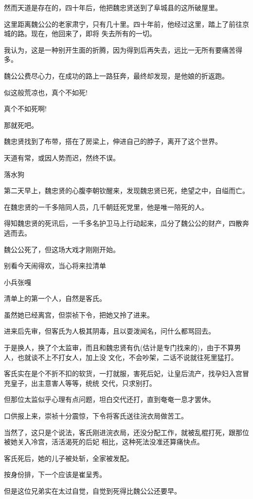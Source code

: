 \documentclass[11pt,a4paper,onecolumn]{article}
\begin{document}
然而天道是存在的，四十年后，他把魏忠贤送到了阜城县的这所破屋里。

这里距离魏公公的老家肃宁，只有几十里。四十年前，他经过这里，踏上了前往京城的路。现在，他回来了，即将
失去所有的一切。

我认为，这是一种别开生面的折腾，因为得到后再失去，远比一无所有要痛苦得多。

魏公公费尽心力，在成功的路上一路狂奔，最终却发现，是他娘的折返跑。

似这般荒凉也，真个不如死!

真个不如死啊!

那就死吧。

魏忠贤找到了布带，搭在了房梁上，伸进自己的脖子，离开了这个世界。

天道有常，或因人势而迟，然终不误。

落水狗

第二天早上，魏忠贤的心腹李朝钦醒来，发现魏忠贤已死，绝望之中，自缢而亡。

在魏忠贤的一千多陪同人员，几千朝廷死党里，他是唯一陪死的人。

得知魏忠贤的死讯后，一千多名护卫马上行动起来，瓜分了魏公公的财产，四散奔逃而去。

魏公公死了，但这场大戏才刚刚开始。

别看今天闹得欢，当心将来拉清单

\myrule 小兵张嘎

清单上的第一个人，自然是客氏。

虽然她已经离宫，但崇祯下令，把她又拎了进来。

进来后先审，但客氏为人极其阴毒，且以耍泼闻名，问什么都骂回去。

于是换人，换了个太监审，而且和魏忠贤有仇(估计是专门找来的)，由于不算男人，也就谈不上不打女人，加上没
文化，不会吵架，二话不说就往死里猛打。

客氏实在是个不折不扣的软货，一打就服，害死后妃，让皇后流产，找孕妇入宫冒充皇子，出主意害人等等，统统
交代，只求别打。

但那位太监似乎心理有点问题，坦白交代还打，直到奄奄一息才罢休。

口供报上来，崇祯十分震惊，下令将客氏送往浣衣局做苦工。

当然了，这只是个说法，客氏刚进浣衣局，还没分配工作，就被乱棍打死，跟那位被她关入冷宫，活活渴死的后妃
相比，这种死法没准还算痛快点。

客氏死后，她的儿子被处斩，全家被发配。

按身份排，下一个应该是崔呈秀。

但是这位兄弟实在太过自觉，自觉到死得比魏公公还要早。
\end{document}
